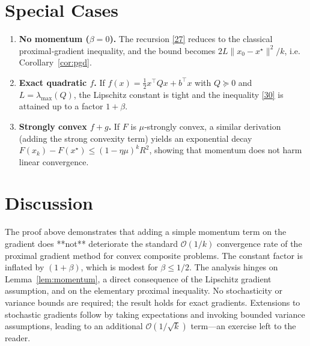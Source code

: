 \documentclass[11pt]{article}
\begin{document}
\section*{Special Cases}
\begin{enumerate}[label=(\alph*)]
  \item \textbf{No momentum ($\beta=0$).}  The recursion \eqref{27} reduces to the classical proximal‑gradient inequality, and the bound becomes $2L\|x_{0}-x^{\star}\|^{2}/k$, i.e. Corollary~\ref{cor:pgd}.
  \item \textbf{Exact quadratic $f$.}  If $f(x)=\frac{1}{2}x^{\top}Qx+b^{\top}x$ with $Q\succeq 0$ and $L=\lambda_{\max}(Q)$, the Lipschitz constant is tight and the inequality \eqref{30} is attained up to a factor $1+\beta$.
  \item \textbf{Strongly convex $f+g$.}  If $F$ is $\mu$‑strongly convex, a similar derivation (adding the strong convexity term) yields an exponential decay $F(x_{k})-F(x^{\star})\le (1-\eta\mu)^{k}R^{2}$, showing that momentum does not harm linear convergence.
\end{enumerate}

\section*{Discussion}
The proof above demonstrates that adding a simple momentum term on the gradient does **not** deteriorate the standard $\mathcal{O}(1/k)$ convergence rate of the proximal gradient method for convex composite problems.  The constant factor is inflated by $(1+\beta)$, which is modest for $\beta\le 1/2$.  The analysis hinges on Lemma~\ref{lem:momentum}, a direct consequence of the Lipschitz gradient assumption, and on the elementary proximal inequality.  No stochasticity or variance bounds are required; the result holds for exact gradients.  Extensions to stochastic gradients follow by taking expectations and invoking bounded variance assumptions, leading to an additional $\mathcal{O}(1/\sqrt{k})$ term—an exercise left to the reader.
\end{document}
